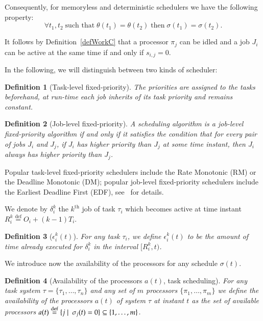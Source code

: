 \documentclass[a4paper,11pt]{article}
\newcommand{\EDF}{\textrm{EDF}}
\newcommand{\RM}{\textrm{RM}}
\newcommand{\DM}{\textrm{DM}}
\newtheorem{Definition}{Definition}
\newcommand{\equals}{\stackrel{\mathrm{def}}{=}}
\begin{document}
Consequently, for memoryless and deterministic schedulers we have the
following property:
\[
\forall t_{1}, t_{2} \;\text{such that}\; \theta(t_{1})=\theta(t_{2})
\;\text{then}\; \sigma(t_{1})=\sigma(t_{2}).
\]



It follows by Definition~\ref{defWorkC} that a processor $\pi_j$ can
be idled and a job $J_i$ can be active at the same time if and
only if $s_{i,j}=0$.

In the following, we will distinguish between two kinds of scheduler:

\begin{Definition}[Task-level fixed-priority]\label{task-level}
The priorities are assigned to the tasks
beforehand, at run-time each job \emph{inherits} of its task
priority and remains constant.
\end{Definition} 

\begin{Definition}[Job-level fixed-priority]\label{prioDr}
  A scheduling algorithm is a {\em job-level fixed-priority}
  algorithm if and only if it satisfies the condition that for every
  pair of jobs $J_i$ and $J_j$, if $J_i$ has higher priority than
  $J_j$ at some time instant, then $J_i$ always has higher priority
  than $J_j$.
\end{Definition} 

Popular task-level fixed-priority schedulers include the Rate Monotonic (\RM) or the Deadline Monotonic (\DM); popular job-level fixed-priority schedulers include the Earliest Deadline First (\EDF), see~\cite{Liu} for details.

We denote by $\delta_i^k$ the $k^{\text{th}}$  job of task $\tau_i$ which
becomes active at time instant $R_i^k \equals O_i+(k-1)T_i$.

\begin{Definition}[$\epsilon_{i}^{k}(t)$]
  For any task $\tau_i$, we define $\epsilon_{i}^{k}(t)$ to be the amount of
  time already executed for $\delta_i^k$ in the interval $[R_i^k,
  t)$.
\end{Definition}

We introduce now the availability of the processors for any schedule
$\sigma(t)$.

\begin{Definition} [Availability of the processors $a(t)$, task scheduling]
\label{defAvai} For any task system $\tau = \{
  \tau_1, \ldots, \tau_n \}$ and any set of $m$ processors
  $\{\pi_1, \ldots, \pi_m \}$ we define the {\em availability of the processors}
  $a(t)$ of system $\tau$ at instant $t$ as the set of available processors
   $a(t)  \equals \{\/j \mid \mbox{ } \sigma_j(t)=0 \} \subseteq \{1,
  \ldots, m\}$.
\end{Definition}
\end{document}
